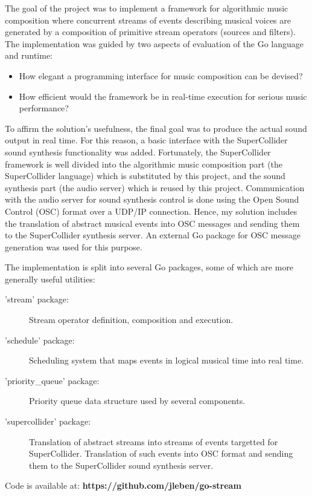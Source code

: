 \documentclass {article}
\begin{document}
The goal of the project was to implement a framework for algorithmic music
composition where concurrent streams of events describing musical voices are
generated by a composition of primitive stream operators (sources and filters).
The implementation was guided by two aspects of evaluation of the Go language
and runtime:

\begin{itemize}
\item How elegant a programming interface for music composition can be devised?
\item How efficient would the framework be in real-time execution for serious
music performance?
\end{itemize}

To affirm the solution's usefulness, the final goal was to produce the actual
sound output in real time. For this reason, a basic interface with the
SuperCollider sound synthesis functionality was added. Fortunately, the
SuperCollider framework is well divided into the algorithmic music composition
part (the SuperCollider language) which is substituted by this project, and the
sound synthesis part (the audio server) which is reused by this project.
Communication with the audio server for sound synthesis control is done using
the Open Sound Control (OSC) format over a UDP/IP connection.
Hence, my solution includes the translation of abstract musical events into OSC
messages and sending them to the SuperCollider synthesis server. An external Go
package for OSC message generation was used for this purpose.

The implementation is split into several Go packages, some of which are more
generally useful utilities:

\begin{description}
\item['stream' package:] Stream operator definition, composition and execution.
\item['schedule' package:] Scheduling system that maps events in logical musical
time into real time.
\item['priority\_queue' package:] Priority queue data structure used by several
components.
\item['supercollider' package:] Translation of abstract streams into streams of
events targetted for SuperCollider. Translation of such events into OSC format
and sending them to the SuperCollider sound synthesis server.
\end{description}

Code is available at: \textbf{https://github.com/jleben/go-stream}
\end{document}
